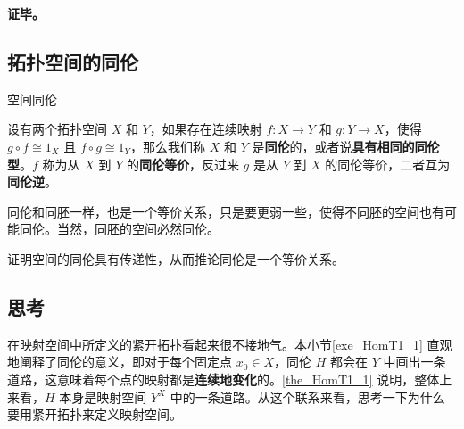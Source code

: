 \textbf{证毕。}

\subsection{拓扑空间的同伦}

\begin{definition}{空间同伦}

设有两个拓扑空间 $X$ 和 $Y$，如果存在连续映射 $f:X\rightarrow Y$ 和 $g: Y\rightarrow X$，使得 $g \circ f \cong 1_X$ 且 $f \circ g \cong 1_Y$，那么我们称 $X$ 和 $Y$ 是\textbf{同伦}的，或者说\textbf{具有相同的同伦型}。$f$ 称为从 $X$ 到 $Y$ 的\textbf{同伦等价}，反过来 $g$ 是从 $Y$ 到 $X$ 的同伦等价，二者互为\textbf{同伦逆}。

\end{definition}

同伦和同胚一样，也是一个等价关系，只是要更弱一些，使得不同胚的空间也有可能同伦。当然，同胚的空间必然同伦。

\begin{exercise}{}
证明空间的同伦具有传递性，从而推论同伦是一个等价关系。
\end{exercise}

\subsection{思考}

在映射空间中所定义的紧开拓扑看起来很不接地气。本小节\autoref{exe_HomT1_1} 直观地阐释了同伦的意义，即对于每个固定点 $x_0\in X$，同伦 $H$ 都会在 $Y$ 中画出一条道路，这意味着每个点的映射都是\textbf{连续地变化}的。\autoref{the_HomT1_1} 说明，整体上来看，$H$ 本身是映射空间 $Y^X$ 中的一条道路。从这个联系来看，思考一下为什么要用紧开拓扑来定义映射空间。

